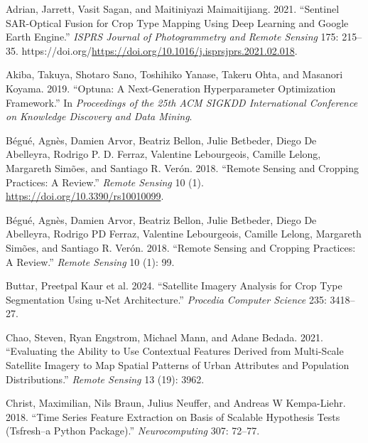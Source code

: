 \documentclass[
  journal,
  twocolumn]{IEEEtran}
\newlength{\cslhangindent}
\newlength{\cslentryspacingunit} %
\newenvironment{CSLReferences}[2] %
 {%
  \setlength{\parindent}{0pt}
  \ifodd #1
  \let\oldpar\par
  \def\par{\hangindent=\cslhangindent\oldpar}
  \fi
  \setlength{\parskip}{#2\cslentryspacingunit}
 }%
 {}
\begin{document}
\hypertarget{refs}{}
\begin{CSLReferences}{1}{0}
\leavevmode{}%
Adrian, Jarrett, Vasit Sagan, and Maitiniyazi Maimaitijiang. 2021.
{``Sentinel SAR-Optical Fusion for Crop Type Mapping Using Deep Learning
and Google Earth Engine.''} \emph{ISPRS Journal of Photogrammetry and
Remote Sensing} 175: 215--35.
https://doi.org/\url{https://doi.org/10.1016/j.isprsjprs.2021.02.018}.

\leavevmode{}%
Akiba, Takuya, Shotaro Sano, Toshihiko Yanase, Takeru Ohta, and Masanori
Koyama. 2019. {``Optuna: A Next-Generation Hyperparameter Optimization
Framework.''} In \emph{Proceedings of the 25th {ACM} {SIGKDD}
International Conference on Knowledge Discovery and Data Mining}.

\leavevmode{}%
Bégué, Agnès, Damien Arvor, Beatriz Bellon, Julie Betbeder, Diego De
Abelleyra, Rodrigo P. D. Ferraz, Valentine Lebourgeois, Camille Lelong,
Margareth Simões, and Santiago R. Verón. 2018. {``Remote Sensing and
Cropping Practices: A Review.''} \emph{Remote Sensing} 10 (1).
\url{https://doi.org/10.3390/rs10010099}.

\leavevmode{}%
Bégué, Agnès, Damien Arvor, Beatriz Bellon, Julie Betbeder, Diego De
Abelleyra, Rodrigo PD Ferraz, Valentine Lebourgeois, Camille Lelong,
Margareth Simões, and Santiago R. Verón. 2018. {``Remote Sensing and
Cropping Practices: A Review.''} \emph{Remote Sensing} 10 (1): 99.

\leavevmode{}%
Buttar, Preetpal Kaur et al. 2024. {``Satellite Imagery Analysis for
Crop Type Segmentation Using u-Net Architecture.''} \emph{Procedia
Computer Science} 235: 3418--27.

\leavevmode{}%
Chao, Steven, Ryan Engstrom, Michael Mann, and Adane Bedada. 2021.
{``Evaluating the Ability to Use Contextual Features Derived from
Multi-Scale Satellite Imagery to Map Spatial Patterns of Urban
Attributes and Population Distributions.''} \emph{Remote Sensing} 13
(19): 3962.

\leavevmode{}%
Christ, Maximilian, Nils Braun, Julius Neuffer, and Andreas W
Kempa-Liehr. 2018. {``Time Series Feature Extraction on Basis of
Scalable Hypothesis Tests (Tsfresh--a Python Package).''}
\emph{Neurocomputing} 307: 72--77.


\end{CSLReferences}
\end{document}
